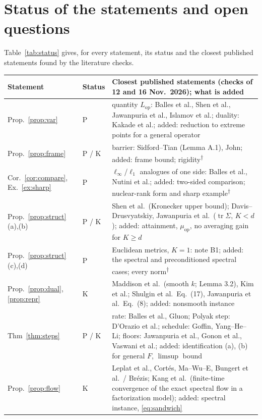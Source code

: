 \documentclass[11pt]{article}
\theoremstyle{definition}
\theoremstyle{remark}
\newcommand{\tr}{\operatorname{tr}}
\newcommand{\Lop}{L_{\mathrm{op}}}
\newcommand{\muop}{\mu_{\mathrm{op}}}
\begin{document}
\section{Status of the statements and open questions}\label{sec:status}

Table~\ref{tab:status} gives, for every statement, its status and the closest published statements found by the
literature checks.

\begin{table}[!t]
\centering\footnotesize
\begin{tabular}{@{}p{3.4cm}p{1.45cm}p{10.65cm}@{}}
\toprule
Statement & Status & Closest published statements (checks of 12 and 16 Nov.\ 2026); what is added\\
\midrule
Prop.~\ref{prop:var} & P & quantity $\Lop$: Balles et al., Shen et al., Jawanpuria et al., Islamov et al.; duality: Kakade et al.; added: reduction to extreme points for a general operator\\
Prop.~\ref{prop:frame} & P / K & barrier: Sidford--Tian (Lemma A.1), John; added: frame bound; rigidity\textsuperscript{$\dagger$}\\
Cor.~\ref{cor:compare}, Ex.~\ref{ex:sharp} & P & $\ell_\infty$/$\ell_1$ analogues of one side: Balles et al., Nutini et al.; added: two-sided comparison; nuclear-rank form and sharp example\textsuperscript{$\dagger$}\\
Prop.~\ref{prop:struct}(a),(b) & P / K & Shen et al.\ (Kronecker upper bound); Davis--Drusvyatskiy, Jawanpuria et al.\ ($\tr\Sigma$, $K<d$); added: attainment, $\muop$, no averaging gain for $K\ge d$\\
Prop.~\ref{prop:struct}(c),(d) & P & Euclidean metrics, $K=1$: note B1; added: the spectral and preconditioned spectral cases; every norm\textsuperscript{$\dagger$}\\
Prop.~\ref{prop:dual}, \ref{prop:repr} & K & Maddison et al.\ (smooth $k$; Lemma 3.2), Kim et al.; Shulgin et al.\ Eq.~(17), Jawanpuria et al.\ Eq.~(8); added: nonsmooth instance\\
Thm~\ref{thm:steps} & P / K & rate: Balles et al., Gluon; Polyak step: D'Orazio et al.; schedule: Goffin, Yang--He--Li; floors: Jawanpuria et al., Gonon et al., Vaswani et al.; added: identification (a), (b) for general $F$, $\limsup$ bound\\
Prop.~\ref{prop:flow} & K & Leplat et al., Cort\'es, Ma--Wu--E, Bungert et al.\ / Br\'ezis; Kang et al.\ (finite-time convergence of the exact spectral flow in a factorization model); added: spectral instance, \eqref{eq:sandwich}\\

\end{tabular}
\end{table}
\end{document}
